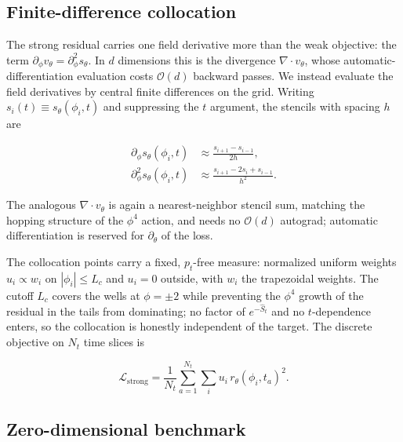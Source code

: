 \documentclass[reprint,twocolumn,superscriptaddress,preprintnumbers,amsmath,amssymb,aps,prd,floatfix]{revtex4-2}
\begin{document}
\subsection{Finite-difference collocation}

The strong residual carries one field derivative more than the weak objective: the
term $\partial_\phi v_\theta=\partial_\phi^2 s_\theta$. In $d$ dimensions this is the
divergence $\nabla\!\cdot v_\theta$, whose automatic-differentiation evaluation costs
$\mathcal{O}(d)$ backward passes. We instead evaluate the field derivatives by
central finite differences on the grid. Writing $s_i(t)\equiv s_\theta(\phi_i,t)$ and
suppressing the $t$ argument, the stencils with spacing $h$ are

\begin{align}
 \partial_\phi s_\theta(\phi_i,t)
 &\approx
 \frac{s_{i+1}-s_{i-1}}{2h},
 \\
 \partial_\phi^2 s_\theta(\phi_i,t)
 &\approx
 \frac{s_{i+1}-2s_i+s_{i-1}}{h^2}.
\end{align}

The analogous $\nabla\!\cdot v_\theta$ is again a nearest-neighbor stencil sum,
matching the hopping structure of the $\phi^4$ action, and needs no $\mathcal{O}(d)$
autograd; automatic differentiation is reserved for $\partial_\theta$ of the loss.

The collocation points carry a fixed, $p_t$-free measure: normalized uniform weights
$u_i\propto w_i$ on $|\phi_i|\le L_c$ and $u_i=0$ outside, with $w_i$ the trapezoidal
weights. The cutoff $L_c$ covers the wells at $\phi=\pm2$ while preventing the
$\phi^4$ growth of the residual in the tails from dominating; no factor of
$e^{-\hat S_t}$ and no $t$-dependence enters, so the collocation is honestly
independent of the target. The discrete objective on $N_t$ time slices is

\begin{equation}
 \mathcal{L}_{\mathrm{strong}}
 =
 \frac{1}{N_t}\sum_{a=1}^{N_t}\sum_i u_i\,r_\theta(\phi_i,t_a)^2 .
 \label{eq:strong_quadrature_loss}
\end{equation}

\subsection{Zero-dimensional benchmark}
\end{document}

